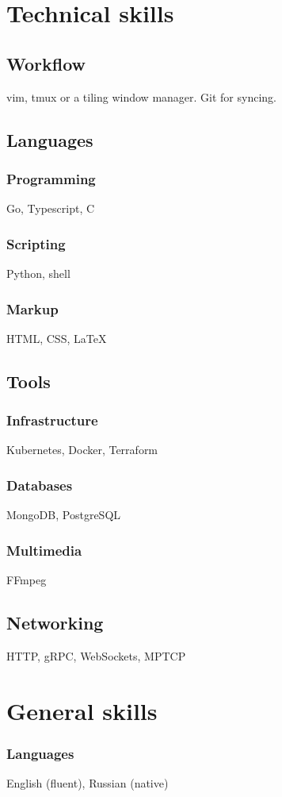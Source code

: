 \documentclass[a4paper,11pt]{article}
\begin{document}
\section{Technical skills}

\subsection{Workflow}
vim, tmux or a tiling window manager. Git for syncing.

\subsection{Languages}

\subsubsection{Programming}
Go, Typescript, C

\subsubsection{Scripting}
Python, shell

\subsubsection{Markup}
HTML, CSS, {\LaTeX}


\subsection{Tools}

\subsubsection{Infrastructure}
Kubernetes, Docker, Terraform

\subsubsection{Databases}
MongoDB, PostgreSQL

\subsubsection{Multimedia}
FFmpeg

\subsection{Networking}
HTTP, gRPC, WebSockets, MPTCP

\section{General skills}

\subsubsection{Languages}
English (fluent), Russian (native)
\end{document}
